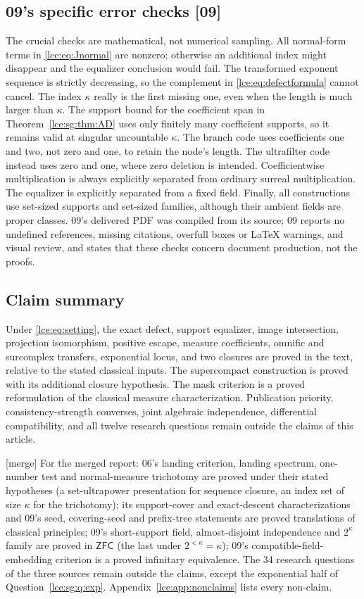 \documentclass[11pt,letterpaper]{article}
\numberwithin{equation}{section}
\theoremstyle{definition}
\theoremstyle{remark}
\newcommand{\ZFC}{\mathsf{ZFC}}
\newcommand{\thref}[1]{Theorem~\ref{#1}}
\newcommand{\src}[1]{\textup{\textsf{\small[#1]}}}%
\newcommand{\mergetag}{\textup{\textsf{\small[merge]}}}%
\begin{document}
\subsection{09's specific error checks \src{09}}
The crucial checks are mathematical, not numerical sampling. All normal-form
terms in \eqref{lce:eq:Jnormal} are nonzero; otherwise an additional index
might disappear and the equalizer conclusion would fail. The transformed
exponent sequence is strictly decreasing, so the complement in
\eqref{lce:eq:defectformula} cannot cancel. The index $\kappa$ really is the
first missing one, even when the length is much larger than $\kappa$. The
support bound for the coefficient span in \thref{lce:sg:thm:AD} uses only
finitely many coefficient supports, so it remains valid at singular
uncountable $\kappa$. The branch code uses coefficients one and two, not zero
and one, to retain the node's length. The ultrafilter code instead uses zero
and one, where zero deletion is intended. Coefficientwise multiplication is
always explicitly separated from ordinary surreal multiplication. The
equalizer is explicitly separated from a fixed field. Finally, all
constructions use set-sized supports and set-sized families, although their
ambient fields are proper classes. 09's delivered PDF was compiled from its
source; 09 reports no undefined references, missing citations, overfull
boxes or LaTeX warnings, and visual review, and states that these checks
concern document production, not the proofs.

\subsection{Claim summary}
Under \eqref{lce:eq:setting}, the exact defect, support equalizer, image
intersection, projection isomorphism, positive escape, measure coefficients,
omnific and surcomplex transfers, exponential locus, and two closures are
proved in the text, relative to the stated classical inputs. The
supercompact construction is proved with its additional closure hypothesis.
The mask criterion is a proved reformulation of the classical measure
characterization. Publication priority, consistency-strength converses,
joint algebraic independence, differential compatibility, and all twelve
research questions remain outside the claims of this article.

\mergetag{} For the merged report: 06's landing criterion, landing
spectrum, one-number test and normal-measure trichotomy are proved under
their stated hypotheses (a set-ultrapower presentation for sequence closure,
an index set of size $\kappa$ for the trichotomy); its support-cover and
exact-descent characterizations and 09's seed, covering-seed and
prefix-tree statements are proved translations of classical principles;
09's short-support field, almost-disjoint independence and $2^\kappa$ family
are proved in $\ZFC$ (the last under $2^{<\kappa}=\kappa$); 09's
compatible-field-embedding criterion is a proved infinitary equivalence.
The 34 research questions of the three sources remain outside the claims,
except the exponential half of Question~\ref{lce:sg:q:exp}.
Appendix~\ref{lce:app:nonclaims} lists every non-claim.
\end{document}

